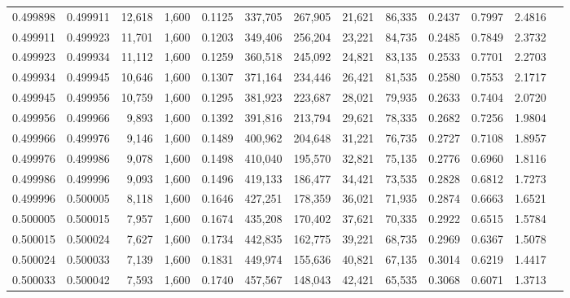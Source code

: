 \begin{tabular}{rrrrrrrrrrrrr}
0.499898 & 0.499911 & 12,618 & 1,600 &                                     0.1125 & 337,705 & 267,905 &  21,621 &  86,335 & 0.2437 & 0.7997 & 2.4816 \\
0.499911 & 0.499923 & 11,701 & 1,600 &                                     0.1203 & 349,406 & 256,204 &  23,221 &  84,735 & 0.2485 & 0.7849 & 2.3732 \\
0.499923 & 0.499934 & 11,112 & 1,600 &                                     0.1259 & 360,518 & 245,092 &  24,821 &  83,135 & 0.2533 & 0.7701 & 2.2703 \\
0.499934 & 0.499945 & 10,646 & 1,600 &                                     0.1307 & 371,164 & 234,446 &  26,421 &  81,535 & 0.2580 & 0.7553 & 2.1717 \\
0.499945 & 0.499956 & 10,759 & 1,600 &                                     0.1295 & 381,923 & 223,687 &  28,021 &  79,935 & 0.2633 & 0.7404 & 2.0720 \\
0.499956 & 0.499966 &  9,893 & 1,600 &                                     0.1392 & 391,816 & 213,794 &  29,621 &  78,335 & 0.2682 & 0.7256 & 1.9804 \\
0.499966 & 0.499976 &  9,146 & 1,600 &                                     0.1489 & 400,962 & 204,648 &  31,221 &  76,735 & 0.2727 & 0.7108 & 1.8957 \\
0.499976 & 0.499986 &  9,078 & 1,600 &                                     0.1498 & 410,040 & 195,570 &  32,821 &  75,135 & 0.2776 & 0.6960 & 1.8116 \\
0.499986 & 0.499996 &  9,093 & 1,600 &                                     0.1496 & 419,133 & 186,477 &  34,421 &  73,535 & 0.2828 & 0.6812 & 1.7273 \\
0.499996 & 0.500005 &  8,118 & 1,600 &                                     0.1646 & 427,251 & 178,359 &  36,021 &  71,935 & 0.2874 & 0.6663 & 1.6521 \\
0.500005 & 0.500015 &  7,957 & 1,600 &                                     0.1674 & 435,208 & 170,402 &  37,621 &  70,335 & 0.2922 & 0.6515 & 1.5784 \\
0.500015 & 0.500024 &  7,627 & 1,600 &                                     0.1734 & 442,835 & 162,775 &  39,221 &  68,735 & 0.2969 & 0.6367 & 1.5078 \\
0.500024 & 0.500033 &  7,139 & 1,600 &                                     0.1831 & 449,974 & 155,636 &  40,821 &  67,135 & 0.3014 & 0.6219 & 1.4417 \\
0.500033 & 0.500042 &  7,593 & 1,600 &                                     0.1740 & 457,567 & 148,043 &  42,421 &  65,535 & 0.3068 & 0.6071 & 1.3713 \\

\end{tabular}
